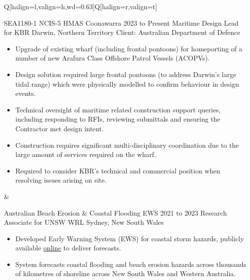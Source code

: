 \begin{table}[h!]
\begin{tblr}{Q[halign=l,valign=h,wd=0.63\textwidth]Q[halign=r,valign=t]}
    {\entrytableprojecthighlight%
	{SEA1180-1 NCIS-5 HMAS Coonawarra}
	{2023 to Present}
	{}
	{Maritime Design Lead for KBR}
	{Darwin, Northern Territory}
	{Client: Australian Department of Defence}
	{\vspace{1em}\begin{itemize}
		 \item Upgrade of existing wharf (including frontal pontoons) for homeporting of a number of new Arafura Class Offshore Patrol Vessels (ACOPVs).
		 \item Design solution required large frontal pontoons (to address Darwin's large tidal range) which were physically modelled to confirm behaviour in design events.
		 \item Technical oversight of maritime related construction support queries, including responding to RFIs, reviewing submittals and ensuring the Contractor met design intent.
		 \item Construction requires significant multi-disciplinary coordination due to the large amount of services required on the wharf.
		 \item Required to consider KBR's technical and commercial position when resolving issues arising on site.
	 \end{itemize}}
	} &  \\
	{\entrytableprojecthighlight%
	{Australian Beach Erosion \& Coastal Flooding EWS}
	{2021 to 2023}
	{}
	{Research Associate for UNSW WRL}
	{Sydney, New South Wales}
	{}
	{\begin{itemize}
		\item Developed Early Warning System (EWS) for coastal storm hazards, publicly available \href{https://coastalews.wrl.unsw.edu.au/}{online} to deliver forecasts.
		\item System forecasts coastal flooding and beach erosion hazards across thousands of kilometres of shoreline across New South Wales and Western Australia.

\end{itemize}}}
\end{tblr}
\end{table}
